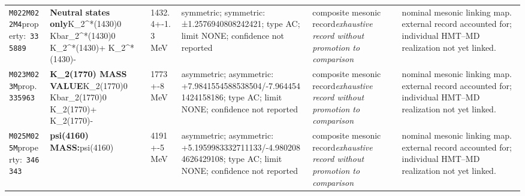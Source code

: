\begin{landscape}
\begin{longtable}{L{1.85cm}L{4.45cm}L{2.35cm}L{4.05cm}L{3.35cm}L{7.15cm}}
\texttt{M022}\newline \texttt{M022M4}\newline property:\ \texttt{335889} & \textbf{Neutral states only}\newline K\_\allowbreak{}2\textasciicircum{}*(1430)0 \textbar{}\allowbreak{} Kbar\_\allowbreak{}2\textasciicircum{}*(1430)0 \textbar{}\allowbreak{} K\_\allowbreak{}2\textasciicircum{}*(1430)+ \textbar{}\allowbreak{} K\_\allowbreak{}2\textasciicircum{}*(1430)- & 1432.4+-1.3\,MeV & symmetric; symmetric: ±1.2576940808242421; type AC; limit NONE; confidence not reported & composite mesonic record\newline \emph{exhaustive record without promotion to comparison} & nominal mesonic linking map. external record accounted for; individual HMT--MD realization not yet linked. \\
\texttt{M023}\newline \texttt{M023M}\newline prop.\ \texttt{335963} & \textbf{K\_\allowbreak{}2(1770) MASS VALUE}\newline K\_\allowbreak{}2(1770)0 \textbar{}\allowbreak{} Kbar\_\allowbreak{}2(1770)0 \textbar{}\allowbreak{} K\_\allowbreak{}2(1770)+ \textbar{}\allowbreak{} K\_\allowbreak{}2(1770)- & 1773+-8\,MeV & asymmetric; asymmetric: +7.9841554588538504/-7.9644541424158186; type AC; limit NONE; confidence not reported & composite mesonic record\newline \emph{exhaustive record without promotion to comparison} & nominal mesonic linking map. external record accounted for; individual HMT--MD realization not yet linked. \\
\texttt{M025}\newline \texttt{M025M}\newline property:\ \texttt{346343} & \textbf{psi(4160) MASS:}\newline psi(4160) & 4191+-5\,MeV & asymmetric; asymmetric: +5.1959983332711133/-4.9802084626429108; type AC; limit NONE; confidence not reported & composite mesonic record\newline \emph{exhaustive record without promotion to comparison} & nominal mesonic linking map. external record accounted for; individual HMT--MD realization not yet linked. \\

\end{longtable}
\end{landscape}
